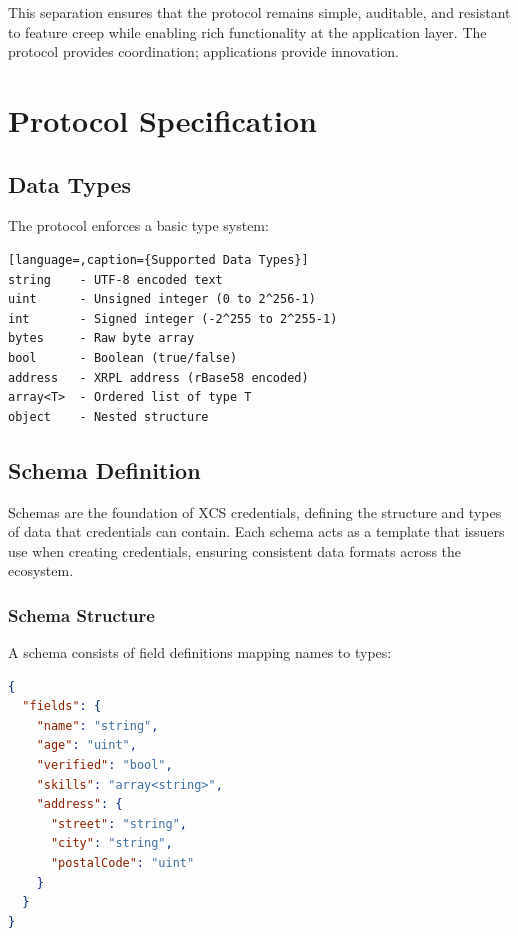\documentclass[11pt,a4paper]{article}
\begin{document}
\vspace{1em}
This separation ensures that the protocol remains simple, auditable, and resistant to feature creep while enabling rich functionality at the application layer. The protocol provides coordination; applications provide innovation.

\section{Protocol Specification}

\subsection{Data Types}

The protocol enforces a basic type system:

\begin{lstlisting}[language=,caption={Supported Data Types}]
string    - UTF-8 encoded text
uint      - Unsigned integer (0 to 2^256-1)
int       - Signed integer (-2^255 to 2^255-1)
bytes     - Raw byte array
bool      - Boolean (true/false)
address   - XRPL address (rBase58 encoded)
array<T>  - Ordered list of type T
object    - Nested structure
\end{lstlisting}

\subsection{Schema Definition}

Schemas are the foundation of XCS credentials, defining the structure and types of data that credentials can contain. Each schema acts as a template that issuers use when creating credentials, ensuring consistent data formats across the ecosystem.

\subsubsection{Schema Structure}

A schema consists of field definitions mapping names to types:

\begin{lstlisting}[language=json,caption={Basic Schema Structure}]
{
  "fields": {
    "name": "string",
    "age": "uint",
    "verified": "bool",
    "skills": "array<string>",
    "address": {
      "street": "string",
      "city": "string",
      "postalCode": "uint"
    }
  }
}
\end{lstlisting}
\end{document}
